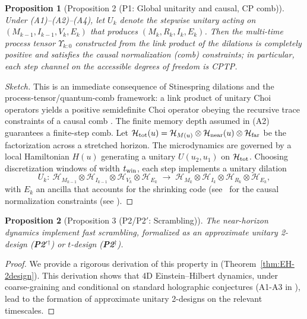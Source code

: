 \documentclass[a4paper,11pt]{article}
\newcommand{\condmark}{\ensuremath{^{\dagger}}}
\newcommand{\Ptwo}{\textbf{P2}\condmark}
\newcommand{\PtwoPrime}{\textbf{P2$'$}\condmark}
\theoremstyle{plain}
\newtheorem{proposition}{Proposition}
\theoremstyle{definition}
\theoremstyle{remark}
\begin{document}
\begin{proposition}[Proposition 2 (P1: Global unitarity and causal, CP comb)]
\label{prop:P1-CP}
Under (A1)--(A2)--(A4), let $U_k$ denote the stepwise unitary acting on $(M_{k-1},I_{k-1},V_k,E_k)$ that produces $(M_k,R_k,I_k,E_k)$.
Then the multi-time process tensor $\Upsilon_{k:0}$ constructed from the link product of the dilations is completely positive and
satisfies the causal normalization (comb) constraints; in particular, each step channel on the accessible degrees of freedom is CPTP.
\end{proposition}
\begin{proof}[Sketch]
This is an immediate consequence of Stinespring dilations and the process-tensor/quantum-comb framework: a link product of unitary
Choi operators yields a positive semidefinite Choi operator obeying the recursive trace constraints of a causal comb
\citep{Chiribella:2009, Pollock:2018, Petz:1986}. The finite memory depth assumed in (A2) guarantees a finite-step comb.
Let $\mathcal{H}_{\rm tot}(u)=\mathcal{H}_{M(u)}\otimes\mathcal{H}_{\rm near}(u)\otimes\mathcal{H}_{\rm far}$ be the factorization across a stretched horizon. The microdynamics are governed by a local Hamiltonian $H(u)$ generating a unitary $U(u_2,u_1)$ on $\mathcal{H}_{\rm tot}$. Choosing discretization windows of width $t_{\rm win}$, each step implements a unitary dilation
\begin{equation}
U_k:\ \mathcal{H}_{M_{k-1}}\otimes\mathcal{H}_{I_{k-1}}\otimes\mathcal{H}_{V_k}\otimes\mathcal{H}_{E_k}
\;\longrightarrow\;
\mathcal{H}_{M_k}\otimes\mathcal{H}_{I_k}\otimes\mathcal{H}_{R_k}\otimes\mathcal{H}_{E_k},
\end{equation}
with $E_k$ an ancilla that accounts for the shrinking code (see~ for the causal normalization constraints (see ).
\end{proof}

\begin{proposition}[Proposition 3 (P2/P2$'$: Scrambling)]
\label{thm:P2-scrambling}
\label{prop:P2-scrambling}
The near-horizon dynamics implement fast scrambling, formalized as an approximate unitary 2-design (\PtwoPrime) or $t$-design (\Ptwo).
\end{proposition}
\begin{proof}
We provide a rigorous derivation of this property in  (Theorem~\ref{thm:EH-2design}). This derivation shows that 4D Einstein--Hilbert dynamics, under coarse-graining and conditional on standard holographic conjectures (A1-A3 in ), lead to the formation of approximate unitary 2-designs on the relevant timescales.
\end{proof}
\end{document}
